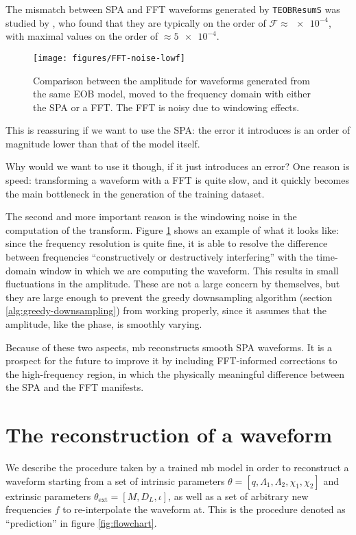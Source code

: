 \documentclass[main.tex]{subfiles}
\begin{document}
The mismatch between \ac{SPA} and \ac{FFT} waveforms generated by \texttt{TEOBResumS} was studied by \textcite{gambaFastFaithfulFrequencydomain2020}, who found that they are typically on the order of \(\mathcal{F} \approx \num{e-4}\), with maximal values on the order of \(\approx \num{5e-4}\). 

\begin{figure}[ht]
\centering
\texttt{[image: figures/FFT-noise-lowf]}
\caption{Comparison between the amplitude for waveforms generated from the same \ac{EOB} model, moved to the frequency domain with either the \ac{SPA} or a \ac{FFT}. The \ac{FFT} is noisy due to windowing effects.}
\label{fig:FFT-noise-lowf}
\end{figure}

This is reassuring if we want to use the \ac{SPA}: the error it introduces is an order of magnitude lower than that of the model itself. 

Why would we want to use it though, if it just introduces an error?
One reason is speed: transforming a waveform with a \ac{FFT} is quite slow, and it quickly becomes the main bottleneck in the generation of the training dataset.

The second and more important reason is the windowing noise in the computation of the transform.
Figure \ref{fig:FFT-noise-lowf} shows an example of what it looks like: since the frequency resolution is quite fine, it is able to resolve the difference between frequencies ``constructively or destructively interfering'' with the time-domain window in which we are computing the waveform. 
This results in small fluctuations in the amplitude. These are not a large concern by themselves, but they are large enough to prevent the greedy downsampling algorithm (section \ref{alg:greedy-downsampling}) from working properly, since it assumes that the amplitude, like the phase, is smoothly varying. 

Because of these two aspects, \ac{mb} reconstructs smooth \ac{SPA} waveforms. It is a prospect for the future to improve it by including \ac{FFT}-informed corrections to the high-frequency region, in which the physically meaningful difference between the \ac{SPA} and the \ac{FFT} manifests. 

\section{The reconstruction of a waveform}

We describe the procedure taken by a trained \ac{mb} model in order to reconstruct a waveform starting from a set of intrinsic parameters \(\theta = [q, \Lambda_1 , \Lambda_2 , \chi_1 , \chi_2 ]\) and extrinsic parameters \(\theta _{\text{ext}} = [M, D_L, \iota]\), as well as a set of arbitrary new frequencies \(f\) to re-interpolate the waveform at. 
This is the procedure denoted as ``prediction'' in figure \ref{fig:flowchart}.
\end{document}
